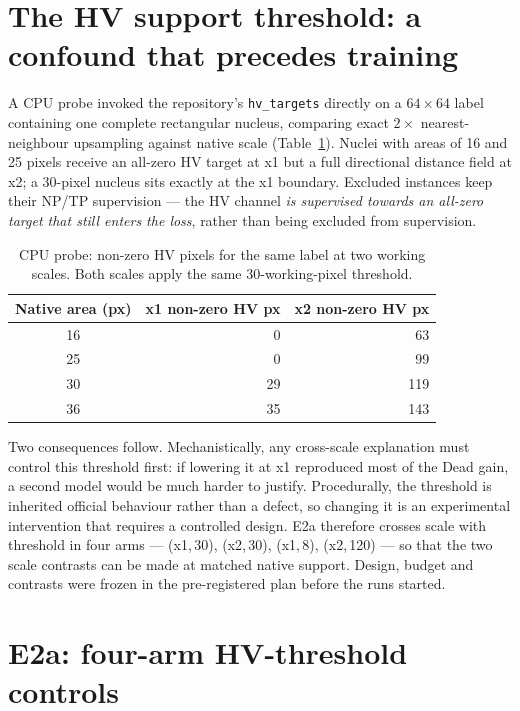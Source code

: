 \documentclass[11pt,a4paper]{article}
\newcommand{\code}[1]{\nolinkurl{#1}}
\begin{document}
\section{The HV support threshold: a confound that precedes training}

A CPU probe invoked the repository's \code{hv\_targets} directly on a $64\times64$ label containing one complete rectangular nucleus, comparing exact $2\times$ nearest-neighbour upsampling against native scale (Table~\ref{tab:hvprobe}). Nuclei with areas of 16 and 25 pixels receive an all-zero HV target at x1 but a full directional distance field at x2; a 30-pixel nucleus sits exactly at the x1 boundary. Excluded instances keep their NP/TP supervision --- the HV channel \emph{is supervised towards an all-zero target that still enters the loss}, rather than being excluded from supervision.

\begin{table}[H]
\centering\small
\caption{CPU probe: non-zero HV pixels for the same label at two working scales. Both scales apply the same 30-working-pixel threshold.}
\label{tab:hvprobe}
\begin{tabular}{crr}\toprule
Native area (px) & x1 non-zero HV px & x2 non-zero HV px\\\midrule
16 & 0 & 63\\
25 & 0 & 99\\
30 & 29 & 119\\
36 & 35 & 143\\\bottomrule
\end{tabular}
\end{table}

Two consequences follow. Mechanistically, any cross-scale explanation must control this threshold first: if lowering it at x1 reproduced most of the Dead gain, a second model would be much harder to justify. Procedurally, the threshold is inherited official behaviour rather than a defect, so changing it is an experimental intervention that requires a controlled design. E2a therefore crosses scale with threshold in four arms --- (x1,\,30), (x2,\,30), (x1,\,8), (x2,\,120) --- so that the two scale contrasts can be made at matched native support. Design, budget and contrasts were frozen in the pre-registered plan\cite{hvplan} before the runs started.

\section{E2a: four-arm HV-threshold controls}
\end{document}
